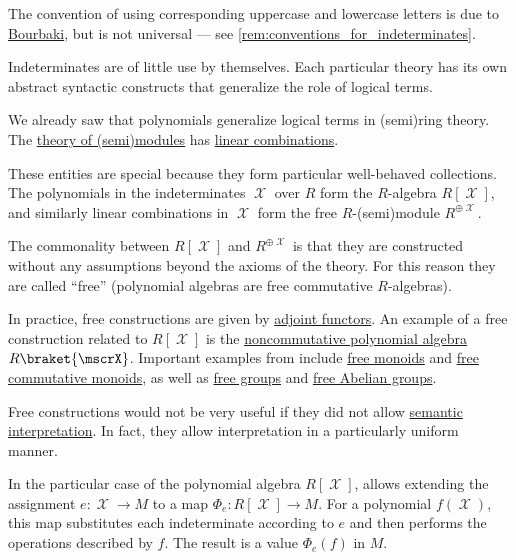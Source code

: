 \begin{concept}
\begin{thmenum}
    The convention of using corresponding uppercase and lowercase letters is due to \hyperref[rem:bourbaki]{Bourbaki}, but is not universal --- see \cref{rem:conventions_for_indeterminates}.

     Indeterminates are of little use by themselves. Each particular theory has its own abstract syntactic constructs that generalize the role of logical terms.

    We already saw that polynomials generalize logical terms in (semi)ring theory. The \hyperref[def:semimodule/theory]{theory of (semi)modules} has \hyperref[def:linear_combination]{linear combinations}.

    These entities are special because they form particular well-behaved collections. The polynomials in the indeterminates \( \mscrX \) over \( R \) form the \( R \)-algebra \( R[\mscrX] \), and similarly linear combinations in \( \mscrX \) form the free \( R \)-(semi)module \( R^{\oplus \mscrX} \).

    The commonality between \( R[\mscrX] \) and \( R^{\oplus \mscrX} \) is that they are constructed without any assumptions beyond the axioms of the theory. For this reason they are called \enquote{free} (polynomial algebras are free commutative \( R \)-algebras).

    In practice, free constructions are given by \hyperref[def:adjoint_functor]{adjoint functors}. An example of a free construction related to \( R[\mscrX] \) is the \hyperref[def:noncommutative_polynomial_algebra]{noncommutative polynomial algebra} \( R\braket{ \mscrX } \). Important examples from  include \hyperref[def:free_monoid]{free monoids} and \hyperref[def:free_commutative_monoid]{free commutative monoids}, as well as \hyperref[def:free_group]{free groups} and \hyperref[def:free_abelian_group]{free Abelian groups}.

     Free constructions would not be very useful if they did not allow \hyperref[con:syntax_semantics_duality]{semantic interpretation}. In fact, they allow interpretation in a particularly uniform manner.

    In the particular case of the polynomial algebra \( R[\mscrX] \),  allows extending the assignment \( e: \mscrX \to M \) to a map \( \Phi_e: R[\mscrX] \to M \). For a polynomial \( f(\mscrX) \), this map substitutes each indeterminate according to \( e \) and then performs the operations described by \( f \). The result is a value \( \Phi_e(f) \) in \( M \).


\end{thmenum}
\end{concept}
